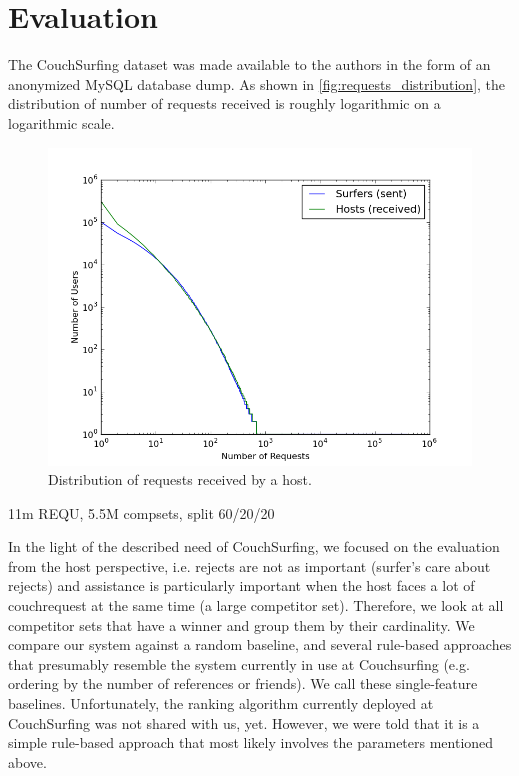 \section{Evaluation} \label{sec:evaluation}

The CouchSurfing dataset was made available to the authors in the form of an anonymized MySQL database dump.
As shown in \autoref{fig:requests_distribution}, the distribution of number of requests received is roughly logarithmic on a logarithmic scale.

\begin{figure}[ht]
\centering
\includegraphics[width=1\linewidth]{figures/req_received_dist2.png}
\caption{Distribution of requests received by a host. }
\label{fig:requests_distribution}
\end{figure}

11m REQU, 5.5M compsets, split 60/20/20

In the light of the described need of CouchSurfing, we focused on the evaluation from the host perspective, i.e. rejects are not as important (surfer's care about rejects) and assistance is particularly important when the host faces a lot of couchrequest at the same time (a large competitor set). Therefore, we look at all competitor sets that have a winner and group them by their cardinality. We compare our system against a random baseline, and several rule-based approaches that presumably resemble the system currently in use at Couchsurfing (e.g. ordering by the number of references or friends). We call these single-feature baselines. Unfortunately, the ranking algorithm currently deployed at CouchSurfing was not shared with us, yet. However, we were told that it is a simple rule-based approach that most likely involves the parameters mentioned above.

